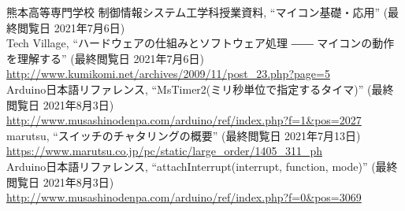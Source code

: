 \documentclass[a4paper,11pt]{jsarticle}
\begin{document}
\begin{thebibliography}{99}
   熊本高等専門学校 制御情報システム工学科授業資料, ``マイコン基礎・応用'' (最終閲覧日 2021年7月6日)\\
   Tech Village, ``ハードウェアの仕組みとソフトウェア処理 ―― マイコンの動作を理解する'' (最終閲覧日 2021年7月6日)\\ \url{http://www.kumikomi.net/archives/2009/11/post_23.php?page=5}\\
   Arduino日本語リファレンス, ``MsTimer2(ミリ秒単位で指定するタイマ)'' (最終閲覧日 2021年8月3日) \\ \url{http://www.musashinodenpa.com/arduino/ref/index.php?f=1&pos=2027} \\
   marutsu, ``スイッチのチャタリングの概要'' (最終閲覧日 2021年7月13日) \\ \url{https://www.marutsu.co.jp/pc/static/large_order/1405_311_ph} \\
   Arduino日本語リファレンス, ``attachInterrupt(interrupt, function, mode)'' (最終閲覧日 2021年8月3日) \\ \url{http://www.musashinodenpa.com/arduino/ref/index.php?f=0&pos=3069}
\end{thebibliography}
\end{document}
